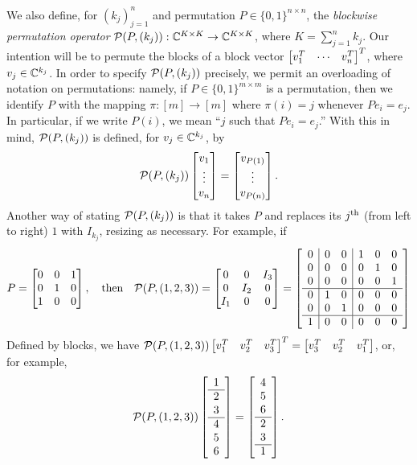 We also define, for $(k_j)_{j = 1}^n$ and permutation $P \in \{0, 1\}^{n \times n}$, the \emph{blockwise permutation operator} $\mathcal{P}(P, (k_j)) : \mathbb{C}^{K \times K} \to \mathbb{C}^{K \times K}$, where $K = \sum_{j = 1}^n k_j$.  Our intention will be to permute the blocks of a block vector $\begin{bmatrix} v^T_{1} & \cdots & v^T_{n} \end{bmatrix}^T$, where $v_j \in \mathbb{C}^{k_j}$.  In order to specify $\mathcal{P}(P, (k_j))$ precisely, we permit an overloading of notation on permutations: namely, if $P \in \{0, 1\}^{m \times m}$ is a permutation, then we identify $P$ with the mapping $\pi : [m] \to [m]$ where $\pi(i) = j$ whenever $P e_i = e_j$.  In particular, if we write $P(i)$, we mean ``$j$ such that $P e_i = e_j$.''  With this in mind, $\mathcal{P}(P, (k_j))$ is defined, for $v_j \in \mathbb{C}^{k_j}$, by \begin{equation} \mathcal{P}(P, (k_j)) \begin{bmatrix} v_1 \\ \vdots \\ v_n \end{bmatrix} = \begin{bmatrix} v_{P(1)} \\ \vdots \\ v_{P(n)} \end{bmatrix}. \label{eq:block_perm} \end{equation}  Another way of stating $\mathcal{P}(P, (k_j))$ is that it takes $P$ and replaces its $j^{\text{th}}$ (from left to right) $1$ with $I_{k_j}$, resizing as necessary.  For example, if \[P = \begin{bmatrix} 0 & 0 & 1 \\ 0 & 1 & 0 \\ 1 & 0 & 0 \end{bmatrix}, \quad \text{then} \quad
  \mathcal{P}(P, (1, 2, 3)) = \begin{bmatrix} 0 & 0 & I_3 \\ 0 & I_2 & 0 \\ I_1 & 0 & 0 \end{bmatrix} = \left[\begin{array}{c|cc|ccc}
    0 & 0 & 0 & 1 & 0 & 0 \\
    0 & 0 & 0 & 0 & 1 & 0 \\
    0 & 0 & 0 & 0 & 0 & 1 \\ \hline
    0 & 1 & 0 & 0 & 0 & 0 \\
    0 & 0 & 1 & 0 & 0 & 0 \\ \hline
    1 & 0 & 0 & 0 & 0 & 0 \\
  \end{array}\right]
\]
Defined by blocks, we have $\mathcal{P}(P, (1, 2, 3)) \begin{bmatrix} v_1^T & v_2^T & v_3^T \end{bmatrix}^T = \begin{bmatrix} v_3^T & v_2^T & v_1^T \end{bmatrix}$, or, for example, \[\mathcal{P}(P, (1, 2, 3)) \left[\begin{array}{c} 1 \\ \hline 2 \\ 3 \\ \hline 4 \\ 5 \\ 6 \end{array}\right] = \left[\begin{array}{c} 4 \\ 5 \\ 6 \\ \hline 2 \\ 3 \\ \hline 1 \end{array}\right].\]

